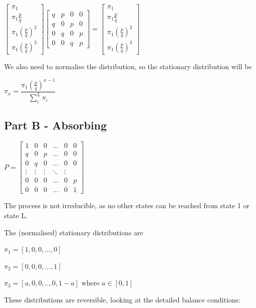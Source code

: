 \documentclass{article}
\begin{document}
 $\begin{bmatrix}
    \pi_1 \\
    \pi_1\frac{p}{q} \\
    \pi_1(\frac{p}{q})^2 \\
    \pi_1(\frac{p}{q})^3 
\end{bmatrix}
\begin{bmatrix}
    q & p & 0 & 0 \\
    q & 0 & p & 0\\
    0 & q & 0 & p\\
    0 & 0 & q & p
\end{bmatrix} = 
\begin{bmatrix}
    \pi_1 \\
    \pi_1\frac{p}{q} \\
    \pi_1(\frac{p}{q})^2 \\
    \pi_1(\frac{p}{q})^3 
\end{bmatrix}$

We also need to normalise the distribution, so the stationary distribution will be

$\pi_x = \dfrac{\pi_1(\frac{p}{q})^{x-1}}{\sum_i^L{\pi_i}}$

\subsection{Part B - Absorbing}

$P = \begin{bmatrix}
    1 & 0 & 0 & \dots  & 0 & 0 \\
    q & 0 & p & \dots  & 0 & 0\\
    0 & q & 0 & \dots  & 0 & 0\\
    \vdots & \vdots & \vdots & \ddots & \vdots \\
    0 & 0 & 0 & \dots & 0 & p \\
    0 & 0 & 0 & \dots & 0 & 1
\end{bmatrix}$

The process is not irreducible, as no other states can be reached from state 1 or state L. 

The (normalised) stationary distributions are

$\pi_1 = [1,0,0,...,0]$

$\pi_2 = [0,0,0,...,1]$

$\pi_3 = [a,0,0,..,0,1-a] \text{ where } a \in [0,1]$



These distributions are reversible, looking at the detailed balance conditions:
\end{document}
